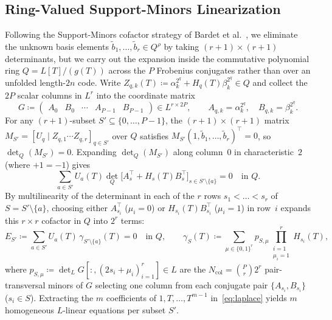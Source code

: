 \documentclass[11pt,a4paper]{article}
\theoremstyle{definition}
\theoremstyle{remark}
\begin{document}
\subsection{Ring-Valued Support-Minors Linearization}
\label{subsec:ct-plucker}

Following the Support-Minors cofactor strategy of Bardet et al.~\cite{BBC+20,BBGT23}, we eliminate the unknown basis elements $\tilde{b}_1, \dots, \tilde{b}_r \in Q^\rho$ by taking $(r+1) \times (r+1)$ determinants, but we carry out the expansion inside the commutative polynomial ring $Q = L[T]/(g(T))$ across the $P$ Frobenius conjugates rather than over an unfolded length-$2n$ code. Write $Z_{q,k}(T) \coloneqq \alpha_k^{2^q} + H_q(T)\beta_k^{2^q} \in Q$ and collect the $2P$ scalar columns in $L^r$ into the coordinate matrix
\[
    G \coloneqq \begin{pmatrix} A_0 & B_0 & \cdots & A_{P-1} & B_{P-1} \end{pmatrix} \in L^{r \times 2P}, \qquad
    A_{q,k} = \alpha_k^{2^q},\quad B_{q,k} = \beta_k^{2^q}.
\]
For any $(r+1)$-subset $S' \subseteq \{0, \dots, P-1\}$, the $(r+1)\times(r+1)$ matrix $M_{S'} = [U_q \mid Z_{q,1} \cdots Z_{q,r}]_{q \in S'}$ over $Q$ satisfies $M_{S'} (1, \tilde{b}_1, \dots, \tilde{b}_r)^\top = 0$, so $\det_Q(M_{S'}) = 0$. Expanding $\det_Q(M_{S'})$ along column~$0$ in characteristic~$2$ (where $+1 = -1$) gives
\[
    \sum_{a \in S'} U_a(T) \det_Q \bigl[A_s^\top + H_s(T) B_s^\top\bigr]_{s \in S' \setminus \{a\}} = 0 \quad \text{in } Q.
\]
By multilinearity of the determinant in each of the $r$ rows $s_1 < \dots < s_r$ of $S = S' \setminus \{a\}$, choosing either $A_{s_i}^\top$ ($\mu_i = 0$) or $H_{s_i}(T) B_{s_i}^\top$ ($\mu_i = 1$) in row~$i$ expands this $r \times r$ cofactor in $Q$ into $2^r$ terms:
\begin{equation}
\label{eq:laplace}
    E_{S'} \coloneqq \sum_{a \in S'} U_a(T) \, \gamma_{S' \setminus \{a\}}(T) = 0 \quad \text{in } Q,
    \qquad
    \gamma_S(T) \coloneqq \sum_{\mu \in \{0,1\}^r} p_{S,\mu} \prod_{\substack{i=1 \\ \mu_i = 1}}^{r} H_{s_i}(T),
\end{equation}
where $p_{S,\mu} \coloneqq \det_L G[:, (2 s_i + \mu_i)_{i=1}^r] \in L$ are the $N_{\text{col}} = \binom{P}{r} 2^r$ pair-transversal minors of $G$ selecting one column from each conjugate pair $\{A_{s_i}, B_{s_i}\}$ ($s_i \in S$). Extracting the $m$ coefficients of $1, T, \dots, T^{m-1}$ in~\eqref{eq:laplace} yields $m$ homogeneous $L$-linear equations per subset $S'$.
\end{document}
